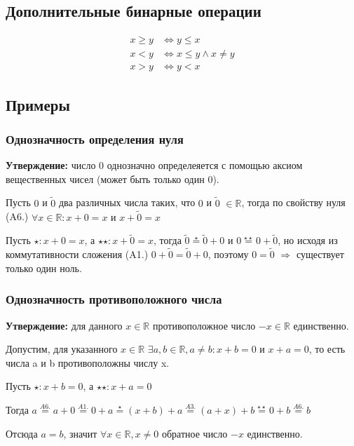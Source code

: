 \documentclass[class=article,a4paper,12pt,crop=false]{standalone}
\begin{document}
  \subsection{Дополнительные бинарные операции}

  \begin{equation}
    \begin{aligned}
      x \geq y & \Leftrightarrow y \leq x \\
      x < y & \Leftrightarrow x \leq y \land x \neq y \\
      x > y & \Leftrightarrow y < x
    \end{aligned}
  \end{equation}

  \subsection{Примеры}

  \subsubsection{Однозначность определения нуля}

  \textbf{Утверждение:} число $0$ однозначно определеяется с помощью
  аксиом вещественных чисел (может быть только один $0$).

  Пусть $0$ и $\widetilde{0}$ два различных числа таких, что $0$ и $\widetilde{0}$ $\in \mathbb{R}$, тогда
  по свойству нуля (A6.) $\forall{x}\in \mathbb{R}: x + 0 = x \text{ и } x + \widetilde{0} = x$

  Пусть $\star : x + 0 = x$, а $\star \star : x + \widetilde{0} = x$,
  тогда $\widetilde{0} \overset{\star}{=} \widetilde{0} + 0$ и 
  $0 \overset{\star \star}{=} 0 + \widetilde{0}$, но исходя из
  коммутативности сложения (A1.) $0 + \widetilde{0} = \widetilde{0} + 0$,
  поэтому $0 = \widetilde{0}$ $\Rightarrow$ существует только один ноль.

  \subsubsection{Однозначность противоположного числа}

  \textbf{Утверждение:} для данного $x \in \mathbb{R}$ противоположное
  число $-x \in \mathbb{R}$ единственно.

  Допустим, для указанного $x \in \mathbb{R}$ $\exists a, b \in \mathbb{R},
  a \neq b: x + b = 0 \text{ и } x + a = 0$, то есть числа a и b 
  противоположны числу x.

  Пусть $\star : x + b = 0$, а $\star \star : x + a = 0$
  
  Тогда $a \overset{A6.}{=} a + 0 \overset{A1.}{=} 0 + a \overset{\star}{=}
  (x + b) + a \overset{A3.}{=} (a + x) + b \overset{\star \star}{=}
  0 + b \overset{A6.}{=} b$

  Отсюда $a = b$, значит $\forall x \in \mathbb{R}, x \neq 0$ обратное
  число $-x$ единственно.

\end{document}
